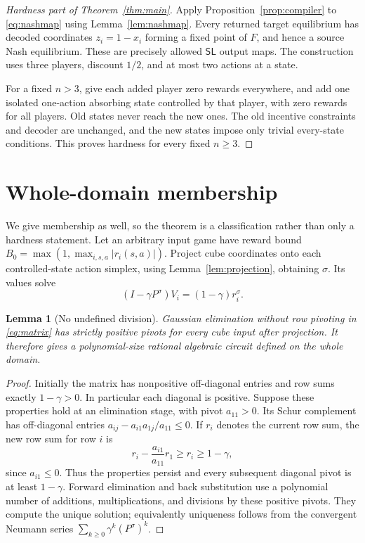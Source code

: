 \documentclass[11pt,a4paper]{article}
\numberwithin{equation}{section}
\newtheorem{lemma}[theorem]{Lemma}
\theoremstyle{definition}
\newcommand{\SL}{\mathsf{SL}}
\begin{document}
\begin{proof}[Hardness part of Theorem~\ref{thm:main}]
Apply Proposition~\ref{prop:compiler} to \eqref{eq:nashmap} using
Lemma~\ref{lem:nashmap}. Every returned target equilibrium has decoded
coordinates \(z_i=1-x_i\) forming a fixed point of \(F\), and hence
a source Nash equilibrium. These are precisely allowed \(\SL\)
output maps. The construction uses three players, discount \(1/2\),
and at most two actions at a state.

For a fixed \(n>3\), give each added player zero rewards everywhere,
and add one isolated one-action absorbing state controlled by that
player, with zero rewards for all players. Old states never reach the
new ones. The old incentive constraints and decoder are unchanged,
and the new states impose only trivial every-state conditions. This
proves hardness for every fixed \(n\geq3\).
\end{proof}

\section{Whole-domain membership}\label{sec:upper}

We give membership as well, so the theorem is a classification rather
than only a hardness statement. Let an arbitrary input game have reward
bound \(B_0=\max(1,\max_{i,s,a}|r_i(s,a)|)\).
Project cube coordinates onto each controlled-state action simplex,
using Lemma~\ref{lem:projection}, obtaining \(\sigma\).
Its values solve
\begin{equation}\label{eq:matrix}
 (I-\gamma P^\sigma)V_i=(1-\gamma)r_i^\sigma.
\end{equation}

\begin{lemma}[No undefined division]\label{lem:pivots}
Gaussian elimination without row pivoting in \eqref{eq:matrix} has
strictly positive pivots for every cube input after projection.
It therefore gives a polynomial-size rational algebraic circuit
defined on the whole domain.
\end{lemma}
\begin{proof}
Initially the matrix has nonpositive off-diagonal entries and row
sums exactly \(1-\gamma>0\). In particular each diagonal is positive.
Suppose these properties hold at an elimination stage, with pivot
\(a_{11}>0\). Its Schur complement has off-diagonal entries
\(a_{ij}-a_{i1}a_{1j}/a_{11}\leq0\).
If \(r_i\) denotes the current row sum, the new row sum for row \(i\)
is
\[
 r_i-\frac{a_{i1}}{a_{11}}r_1\geq r_i\geq1-\gamma,
\]
since \(a_{i1}\leq0\). Thus the properties persist and every subsequent
diagonal pivot is at least \(1-\gamma\). Forward elimination and back
substitution use a polynomial number of additions, multiplications,
and divisions by these positive pivots. They compute the unique
solution; equivalently uniqueness follows from the convergent Neumann
series \(\sum_{k\geq0}\gamma^k(P^\sigma)^k\).
\end{proof}
\end{document}
